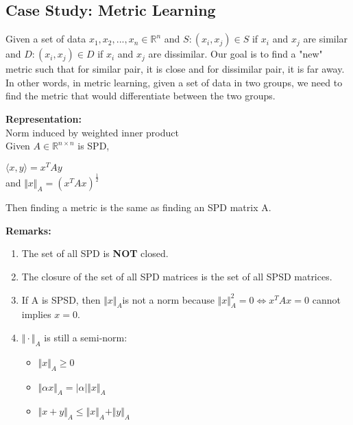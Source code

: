 \documentclass{article}
\begin{document}
\subsection*{Case Study: Metric Learning}
Given a set of data $x_1,x_2,...,x_n \in \mathbb{R}^{n}$ and
$S: (x_i,x_j) \in S$ if $x_i$ and $x_j$ are similar and $D: (x_i,x_j) \in D$ if $x_i$ and $x_j$ are dissimilar. 
\bigbreak
Our goal is to find a "new" metric such that for similar pair, it is close and for dissimilar pair, it is far away. In other words, in metric learning, given a set of data in two groups, we need to find the metric that would differentiate between the two groups. 

\begin{center}
\end{center}

\bigbreak
 
\textbf{Representation:} \\
Norm induced by weighted inner product \\
Given $A \in \mathbb{R}^{n \times n}$ is SPD,
\begin{center}
    $\langle x, y \rangle = x^TAy$ \\
    and $\Vert x \Vert_A = (x^TAx)^\frac{1}{2}$

\end{center}

Then finding a metric is the same as finding an SPD matrix A. 
\bigbreak

\textbf{Remarks:} 
\begin{enumerate}
    \item The set of all SPD is \textbf{NOT} closed. 
    \item The closure of the set of all SPD matrices is the set of all SPSD matrices.
    \item If A is SPSD, then $\Vert x \Vert_A$is not a norm because $\Vert x \Vert_A^2 = 0 \iff x^TAx = 0$ cannot implies $x = 0$. 
    \item $\Vert \cdot \Vert_A$ is still a semi-norm:
    \begin{itemize}
        \item $\Vert x \Vert_A \geq 0$
        \item $\Vert \alpha x \Vert_A = \mid{\alpha}\mid \Vert x \Vert_A$
        \item $\Vert x + y \Vert_A \leq \Vert x \Vert_A + \Vert y \Vert_A$
    \end{itemize}
\end{enumerate}
\end{document}
